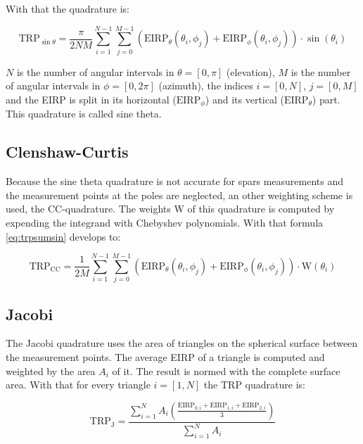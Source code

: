 With that the quadrature is:

\begin{equation}
\text{TRP}_{\sin\theta} = \frac{\pi}{2NM}\sum^{N-1}_{i=1}\sum^{M-1}_{j=0}\left(\text{EIRP}_\theta\left(\theta_i,\phi_j\right)+\text{EIRP}_\phi\left(\theta_i,\phi_j\right)\right)\cdot\sin\left(\theta_i\right)
\label{eq:trpsumsin}
\end{equation}

$N$ is the number of angular intervals in $\theta=\left[0,\pi\right]$ (elevation), $M$ is the number of angular intervals in $\phi=\left[0,2\pi\right]$ (azimuth), the indices $i=\left[0,N\right]$, $j=\left[0,M\right]$ and the \ac{EIRP} is split in its horizontal ($\text{EIRP}_\phi$) and its vertical ($\text{EIRP}_\theta$) part. This quadrature is called sine theta.

\subsection{Clenshaw-Curtis}

Because the sine theta quadrature is not accurate for spars measurements and the measurement points at the poles are neglected, an other weighting scheme is used, the \ac{CC}-quadrature. The weights W of this quadrature is computed by expending the integrand with Chebyshev polynomials. With that formula \ref{eq:trpsumsin} develops to: \cite{trp}

\begin{equation}
\text{TRP}_{\text{CC}} = \frac{1}{2M}\sum^{N-1}_{i=1}\sum^{M-1}_{j=0}\left(\text{EIRP}_\theta\left(\theta_i,\phi_j\right)+\text{EIRP}_\phi\left(\theta_i,\phi_j\right)\right)\cdot\text{W}\left(\theta_i\right)
\label{eq:trpsumcc}
\end{equation}

\subsection{Jacobi}

The Jacobi quadrature uses the area of triangles on the spherical surface between the measurement points. The average \ac{EIRP} of a triangle is computed and weighted by the area $A_i$ of it. The result is normed with the complete surface area. With that for every triangle $i=\left[1,N\right]$ the \ac{TRP} quadrature is: \cite{trp}

\begin{equation}
\text{TRP}_{\text{J}} = \frac{\sum^N_{i=1}A_i\left(\frac{\text{EIRP}_{0,i}+\text{EIRP}_{1,i}+\text{EIRP}_{2,i}}{3}\right)}{\sum^N_{i=1}A_i}
\end{equation}

